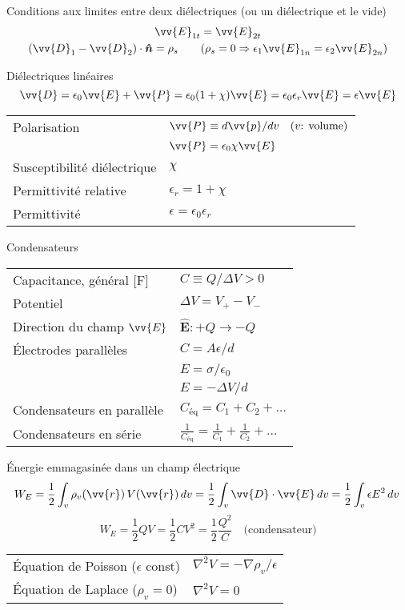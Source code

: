 \documentclass[10pt,landscape]{article}
\newcommand{\extraline}{\vspace{1em}}
\newcommand{\halfline}{\vspace{0.5em}}
\newcommand{\tableindent}{\hspace{1.5em}}
\newcommand{\uvec}[1]{\ensuremath{\boldsymbol{\hat{#1}}}}
\begin{document}
\begin{multicols}{3}
\extraline
Conditions aux limites entre deux diélectriques (ou un diélectrique et le vide)
\begin{gather*}
\vv{E}_{1t} =\vv{ E}_{2t}  \\
 (\vv{D}_1 - \vv{D}_2) \cdot \uvec{n} = \rho_s  \qquad (\rho_s=0 \Rightarrow \epsilon_1 \vv{E}_{1n} = \epsilon_2 \vv{E}_{2n})
\end{gather*}

\halfline
Diélectriques linéaires
\[ \vv{D} = \epsilon_0\vv{E} + \vv{P} = \epsilon_0(1+\chi)\vv{E} = \epsilon_0\epsilon_r\vv{E} = \epsilon\vv{E}  \]
\begin{tabular}{@{\tableindent}ll@{}}
	Polarisation  & $\vv{P} \equiv d\vv{p}/dv \quad (\text{$v$: volume})$ \\
	  & $\vv{P} = \epsilon_0\chi\vv{E}$ \\
	Susceptibilité diélectrique  & $\chi$ \\
	Permittivité relative &  $\epsilon_r=1+\chi$ \\
	Permittivité & $\epsilon = \epsilon_0\epsilon_r$
\end{tabular}

\extraline
Condensateurs  \\
\halfline
\begin{tabular}{@{\tableindent}ll@{}}
	Capacitance, général [\si{\farad}] & $\displaystyle C \equiv {Q}/{\Delta V}  > 0 $ \\
	Potentiel  & $\Delta V = V_+ - V_-$ \\
	Direction du champ $\vv{E}$ & $\uvec{E}: +Q \to -Q$ \\
	Électrodes parallèles & $C = {A\epsilon}/{d}$ \\
	 & $E = {\sigma}/{\epsilon_0}$ \\
	 & $E =  -{\Delta V}/{d}$ \\
	Condensateurs en parallèle  & $C_\text{éq} = C_1 + C_2 + \dots$ \\
	Condensateurs en série & $\displaystyle\frac{1}{C_\text{éq}} = \frac{1}{C_1} + \frac{1}{C_2} + \dots $\\
\end{tabular}


\halfline
Énergie emmagasinée dans un champ électrique
\[ W_E = \frac{1}{2} \int_v  \rho_v(\vv{r})  \, V(\vv{r}) \, dv 
= \frac{1}{2} \int_v  \vv{D}\cdot\vv{E} \, dv 
= \frac{1}{2} \int_v  \epsilon E^2 \, dv 
\frac{}{}\]
\[ W_E = \frac{1}{2} QV = \frac{1}{2} CV^2 = \frac{1}{2}\frac{Q^2}{C} \quad\text{(condensateur)} \]

\halfline
\begin{tabular}{@{}ll@{}}
	Équation de Poisson ($\epsilon$ const) & $\nabla^2 V = -{\nabla\rho_v}/{\epsilon}$ \\
	Équation de Laplace ($\rho_v=0$) & $\nabla^2 V = 0$ \\ 
\end{tabular}



\end{multicols}
\end{document}
